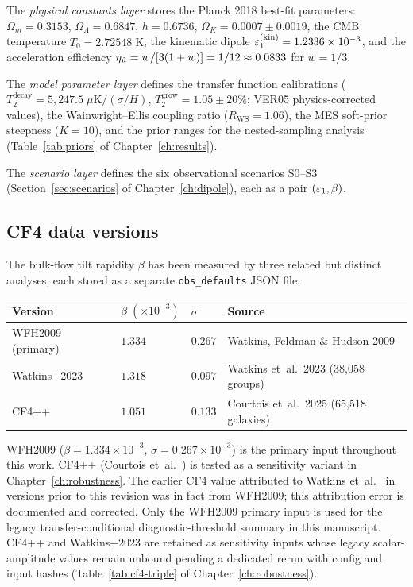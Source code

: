 The \emph{physical constants layer} stores the Planck 2018
best-fit parameters: $\Omega_m = 0.3153$,
$\Omega_\Lambda = 0.6847$, $h = 0.6736$,
$\Omega_K = 0.0007 \pm 0.0019$, the CMB temperature
$T_0 = 2.72548\;\mathrm{K}$, the kinematic dipole
$\varepsilon_1^{(\mathrm{kin})} = 1.2336 \times 10^{-3}$, and the
acceleration efficiency
$\eta_{\dot{u}} = w/[3(1+w)] = 1/12 \approx 0.0833$ for $w = 1/3$.

The \emph{model parameter layer} defines the transfer function
calibrations ($T_2^{\mathrm{decay}} = 5{,}247.5\;\mu\mathrm{K}/(\sigma/H)$,
$T_2^{\mathrm{grow}} = 1.05 \pm 20\%$; VER05 physics-corrected values), the Wainwright--Ellis
coupling ratio ($R_{\mathrm{WS}} = 1.06$), the MES
soft-prior steepness ($K = 10$), and the prior ranges for the
nested-sampling analysis
(Table~\ref{tab:priors} of Chapter~\ref{ch:results}).

The \emph{scenario layer} defines the six observational
scenarios S0--S3 (Section~\ref{sec:scenarios} of
Chapter~\ref{ch:dipole}), each as a pair $(\varepsilon_1, \beta)$.

\subsection{CF4 data versions}\label{sec:cf4-versions}

The bulk-flow tilt rapidity $\beta$ has been measured by three
related but distinct analyses, each stored as a separate
\texttt{obs\_defaults} JSON file:
\begin{center}\footnotesize
\begin{tabular}{llll}
\hline\hline
Version & $\beta \;(\times 10^{-3})$ & $\sigma$ & Source \\
\hline
WFH2009 (primary) & $1.334$ & $0.267$ & Watkins, Feldman \& Hudson 2009 \\
Watkins+2023 & $1.318$ & $0.097$ & Watkins et~al.\ 2023 (38,058 groups) \\
CF4++ & $1.051$ & $0.133$ & Courtois et~al.\ 2025 (65,518 galaxies) \\
\hline\hline
\end{tabular}
\end{center}
\noindent
WFH2009 ($\beta = 1.334 \times 10^{-3}$, $\sigma = 0.267 \times 10^{-3}$)
is the primary input throughout this work.
CF4++ (Courtois et~al.~\cite{Courtois2025}) is tested as a
sensitivity variant in Chapter~\ref{ch:robustness}.
The earlier CF4 value attributed to
Watkins et~al.~\cite{Watkins2023} in versions prior to this
revision was in fact from WFH2009; this attribution error is
documented and corrected.  Only the WFH2009 primary input is used
for the legacy transfer-conditional diagnostic-threshold summary in
this manuscript.  CF4++ and Watkins+2023 are retained as sensitivity
inputs whose legacy scalar-amplitude values remain unbound pending a
dedicated rerun with config and input hashes (Table~\ref{tab:cf4-triple}
of Chapter~\ref{ch:robustness}).



